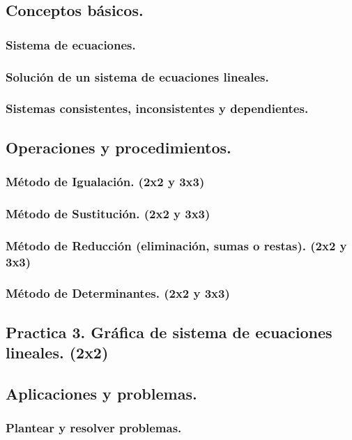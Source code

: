 \subsection{Conceptos básicos.}
\subsubsection{Sistema de ecuaciones.}
\subsubsection{Solución de un sistema de ecuaciones lineales.}
\subsubsection{Sistemas consistentes, inconsistentes y dependientes.}

\subsection{Operaciones y procedimientos.}

\subsubsection{Método de Igualación. (2x2 y 3x3)}
\subsubsection{Método de Sustitución. (2x2 y 3x3)}
\subsubsection{Método de Reducción (eliminación, sumas o restas). (2x2 y 3x3)}
\subsubsection{Método de Determinantes. (2x2 y 3x3)}

\subsection{Practica 3. Gráfica de sistema de ecuaciones lineales. (2x2)}

\subsection{Aplicaciones y problemas.}
\subsubsection{Plantear y resolver problemas.}
